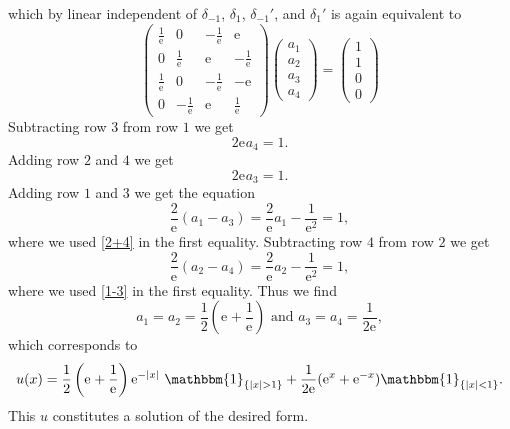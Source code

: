 \documentclass[a4paper,11pt]{article}
\newcommand{\euler}[1]{\text{e}^{#1}}
\newcommand{\abs}[1]{\left\lvert #1 \right\rvert}
\numberwithin{equation}{section}
\begin{document}
which by linear independent of $ \delta_{-1} $, $ \delta_{1} $, $ \delta_{-1}' $, and $ \delta_1' $ is again equivalent to \begin{equation}
\begin{pmatrix}
\frac{1}{\euler{}}&0&-\frac{1}{\euler{}}&\euler{}\\
0&\frac{1}{\euler{}}&\euler{}&-\frac{1}{\euler{}}\\
\frac{1}{\euler{}}&0&-\frac{1}{\euler{}}&-\euler{}\\
0&-\frac{1}{\euler{}}&\euler{}&\frac{1}{\euler{}}
\end{pmatrix}
\begin{pmatrix}
a_1\\a_2\\a_3\\a_4
\end{pmatrix}=\begin{pmatrix}
1\\1\\0\\0
\end{pmatrix}
\end{equation}
Subtracting row $ 3 $ from row $ 1 $ we get \begin{equation}\label{1-3}
2\euler{}a_4=1.
\end{equation}
Adding row $ 2 $ and $ 4 $ we get \begin{equation}\label{2+4}
2\euler{}a_3=1.
\end{equation}
Adding row $ 1 $ and $ 3 $ we get the equation \begin{equation}
\frac{2}{\euler{}}(a_1-a_3)=\frac{2}{\euler{}}a_1-\frac{1}{\euler{2}}=1,
\end{equation}
where we used \eqref{2+4} in the first equality. Subtracting row $ 4 $ from row $ 2 $ we get\begin{equation}
\frac{2}{\euler{}}(a_2-a_4)=\frac{2}{\euler{}}a_2-\frac{1}{\euler{2}}=1,
\end{equation}
where we used \eqref{1-3} in the first equality. Thus we find \begin{equation}
a_1=a_2=\frac{1}{2}\left(\euler{}+\frac{1}{\euler{}}\right)\text{  and  } a_3=a_4=\frac{1}{2\euler{}},
\end{equation}
which corresponds to \begin{equation}
u(x)=\frac{1}{2}\left(\euler{}+\frac{1}{\euler{}}\right)\euler{-\abs{x}}\ \mathbbm{1}_{\{\abs{x}>1\}}+\frac{1}{2\euler{}}(\euler{x}+\euler{-x})\mathbbm{1}_{\{\abs{x}<1\}}.
\end{equation}
This $ u $ constitutes a solution of the desired form.
\end{document}
